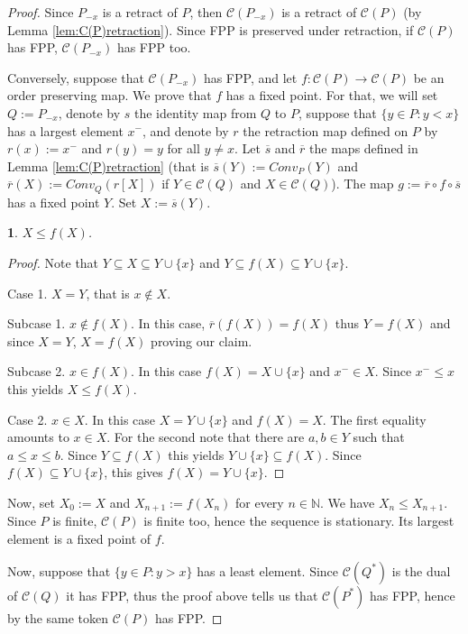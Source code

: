 \documentclass[12pt]{amsart}
\newtheorem{claim}[definition]{\noindent {\bf Claim}}
\begin{document}
\begin {proof} 
Since $P_{-x}$ is a retract of $P$, then $\mathcal C (P_{-x})$ is a
retract of $\mathcal C (P)$ (by Lemma
\ref{lem:C(P)retraction}). Since FPP is preserved under retraction, if
$\mathcal C (P)$ has FPP, $\mathcal C (P_{-x})$ has FPP
too. 

Conversely, suppose that $\mathcal C (P_{-x})$ has FPP, and let
$f:\mathcal C (P)\rightarrow \mathcal C (P)$ be an order preserving
map. We prove that $f$ has a fixed point. For that, we will set
$Q:=P_{-x}$, denote by $s$ the identity map from $Q$ to $P$, suppose
that $\{y\in P: y<x\}$ has a largest element $x^-$, and denote by $r$
the retraction map defined on $P$ by $r(x):=x^-$ and $r(y)=y$ for all
$y\not =x$.  Let $\overline s$ and $\overline r$ the maps defined in
Lemma \ref{lem:C(P)retraction} (that is $\overline s(Y):=Conv_P(Y)$
and $\overline r(X):= Conv_Q(r[X])$ if $Y\in \mathcal C (Q)$ and $X\in
\mathcal C (Q)$). The map $g:= \overline r\circ f\circ \overline s$
has a fixed point $Y$. Set $X:= \overline s(Y)$.
 

\begin{claim}\label{claim: comparability} 
$X\leq f(X)$.  
\end{claim} 

\begin{proof}
Note that $Y\subseteq X\subseteq Y\cup \{x\}$ and $Y\subseteq
f(X)\subseteq Y\cup \{x\}$.
 
\noindent Case 1. $X=Y$, that is $x\not\in X$. 

Subcase 1. $x\not \in f(X)$.  In this case, $\overline r(f(X))=f(X)$
thus $Y=f(X)$ and since $X=Y$, $X=f(X)$ proving our claim.  

Subcase 2. $x\in f(X)$. In this case $f(X)=X\cup \{x\}$ and $x^-\in
X$. Since $x^-\leq x$ this yields $X\leq f(X)$.
 
\noindent Case 2. $x\in X$. In this case $X= Y \cup \{x\}$ and $f(X)=X$. The
first equality amounts to $x\in X$.  For the second note that there
are $a, b\in Y$ such that $a\leq x\leq b$. Since $Y\subseteq f(X)$
this yields $Y\cup \{x\}\subseteq f(X)$. Since $f(X)\subseteq Y\cup
\{x\}$, this gives $f(X)= Y\cup \{x\}$.  
\end{proof}
 
 
Now, set $X_0:=X$ and $X_{n+1}:=f(X_{n})$ for every $n\in {\mathbb{N}}$. We have
$X_n\leq X_{n+1}$. Since $P$ is finite, $\mathcal C (P)$ is finite
too, hence the sequence is stationary. Its largest element is a fixed
point of $f$.
 
Now, suppose that $\{y\in P: y>x\}$ has a least element. Since
$\mathcal C (Q^*)$ is the dual of $\mathcal C (Q)$ it has FPP,
thus the proof above tells us that $\mathcal C (P^*)$ has FPP,
hence by the same token $\mathcal C (P)$ has FPP. \end{proof}
 
\end{document}
